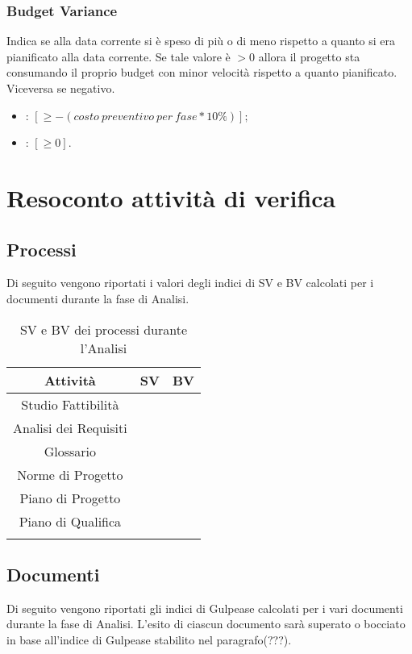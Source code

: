 \subsubsection{Budget Variance}
\label{4.3.2}
Indica se alla data corrente si è speso di più o di meno rispetto a quanto si era pianificato alla data corrente. Se tale valore è $>0$ allora il progetto sta consumando il proprio budget con minor velocità rispetto a quanto pianificato. Viceversa se negativo.
\begin{itemize}
\item {}: $[\geq -(costo\:preventivo\:per\:fase * 10\%)];$
\item {}: $[\geq 0].$
\end{itemize}

\newpage
\section{Resoconto attività di verifica}
\label{5.0}

\subsection{Processi}
\label{5.1}
Di seguito vengono riportati i valori degli indici di SV e BV calcolati per i documenti durante la fase di Analisi.

\begin{longtable}{|c|p{3cm}|p{3cm}|}
\toprule
\textbf{Attività} & \textbf{SV} & \textbf{BV} \\


\midrule
Studio Fattibilità & & \\
\midrule
Analisi dei Requisiti & & \\
\midrule
Glossario & & \\
\midrule
Norme di Progetto & & \\
\midrule
Piano di Progetto  & & \\
\midrule
Piano di Qualifica & & \\
\bottomrule
\caption{SV e BV dei processi durante l'Analisi}
\label{tab:changelog}
\end{longtable}

\subsection{Documenti}
\label{5.2}
Di seguito vengono riportati gli indici di Gulpease calcolati per i vari documenti durante la fase di Analisi. L'esito di ciascun documento sarà superato o bocciato in base all'indice di Gulpease stabilito nel paragrafo(???).

